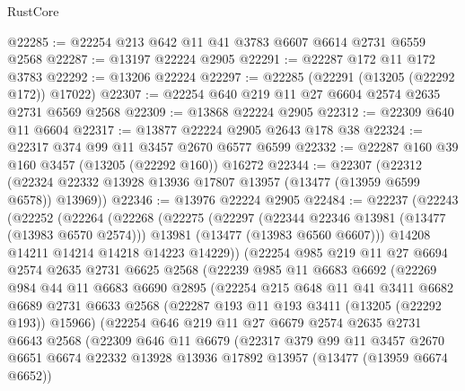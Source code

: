 \begin{lexlean}{RustCore}
\begin{coremodule}
@22285 := @22254 @213 @642 @11 @41 @3783 @6607 @6614 @2731 @6559 @2568
@22287 := @13197 @22224 @2905
@22291 := @22287 @172 @11 @172 @3783
@22292 := @13206 @22224
@22297 := @22285 (@22291 (@13205 (@22292 @172)) @17022)
@22307 := @22254 @640 @219 @11 @27 @6604 @2574 @2635 @2731 @6569 @2568
@22309 := @13868 @22224 @2905
@22312 := @22309 @640 @11 @6604
@22317 := @13877 @22224 @2905 @2643 @178 @38
@22324 := @22317 @374 @99 @11 @3457 @2670 @6577 @6599
@22332 := @22287 @160 @39 @160 @3457 (@13205 (@22292 @160)) @16272
@22344 := @22307
    (@22312 (@22324 @22332 @13928 @13936 @17807 @13957 (@13477 (@13959 @6599 @6578)) @13969))
@22346 := @13976 @22224 @2905
@22484 := @22237
    (@22243
      (@22252
        (@22264
          (@22268
            (@22275
              (@22297
                (@22344 @22346 @13981 (@13477 (@13983 @6570 @2574)))
                @13981
                (@13477 (@13983 @6560 @6607)))
              @14208
              @14211
              @14214
              @14218
              @14223
              @14229))
          (@22254
            @985
            @219
            @11
            @27
            @6694
            @2574
            @2635
            @2731
            @6625
            @2568
            (@22239
              @985
              @11
              @6683
              @6692
              (@22269
                @984
                @44
                @11
                @6683
                @6690
                @2895
                (@22254
                  @215
                  @648
                  @11
                  @41
                  @3411
                  @6682
                  @6689
                  @2731
                  @6633
                  @2568
                  (@22287 @193 @11 @193 @3411 (@13205 (@22292 @193)) @15966)
                  (@22254
                    @646
                    @219
                    @11
                    @27
                    @6679
                    @2574
                    @2635
                    @2731
                    @6643
                    @2568
                    (@22309
                      @646
                      @11
                      @6679
                      (@22317
                        @379
                        @99
                        @11
                        @3457
                        @2670
                        @6651
                        @6674
                        @22332
                        @13928
                        @13936
                        @17892
                        @13957
                        (@13477 (@13959 @6674 @6652))

\end{coremodule}
\end{lexlean}

